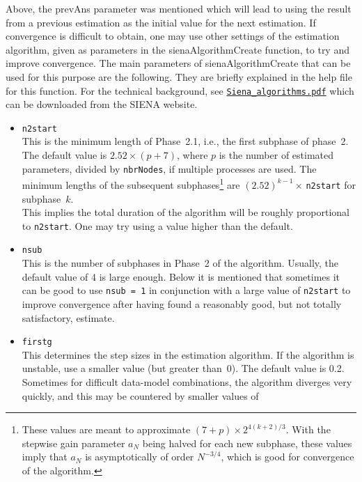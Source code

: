 \documentclass[a4paper,fleqn,11pt]{article}
\newcommand{\+}{\, + \,}
\newcommand{\sfn}[1]{\textsf{#1}}
\newcommand{\SI}{{\sf SIENA }}
\begin{document}
Above, the \sfn{prevAns} parameter was mentioned which will
lead to using the result from a previous estimation as the initial
value for the next estimation.
If convergence is difficult to obtain, one may use other
settings of the estimation algorithm, given as
parameters in the \sfn{sienaAlgorithmCreate} function, to try and
improve convergence.
The main parameters of \sfn{sienaAlgorithmCreate} that can be used
for this purpose are the following.
They are briefly explained in the help file for this function.
For the technical background, see
\href{http://www.stats.ox.ac.uk/~snijders/siena/Siena_algorithms.pdf}{\texttt{Siena\_algorithms.pdf}}
which can be downloaded from the \SI website.

\begin{itemize}
\item \texttt{n2start}\\
    This is the minimum length of Phase~2.1, i.e., the first subphase of phase~2.
    The default value
     is $2.52\times (p+7)$, where $p$ is the number of estimated parameters,
     divided by \texttt{nbrNodes}, if multiple processes are used.
    The minimum lengths of the subsequent subphases\footnote{These values are
     meant to approximate $(7+p)\times 2^{4(k+2)/3}$.
    With the stepwise gain parameter $a_N$ being halved
    for each new subphase, these values
    imply that $a_N$ is asymptotically of order $N^{-3/4}$, which is
    good for convergence of the algorithm.}
    are $(2.52)^{k-1} \times\,$\texttt{n2start} for subphase~$k$.\\
    This implies the total duration of the algorithm will be roughly proportional to
    \texttt{n2start}. One may try using a value higher than the default.
\item \texttt{nsub}\\
    This is the number of subphases in Phase~2 of the algorithm.
    Usually, the default value of 4 is large enough. Below it is mentioned
    that sometimes it can be good to use \texttt{nsub~=~1} in conjunction
    with a large value of \texttt{n2start} to improve convergence
    after having found a reasonably good, but not totally satisfactory,
    estimate.
\item \texttt{firstg}\\
    This determines the step sizes in the estimation algorithm. If the algorithm is unstable,
    use a smaller value (but greater than~0).
    The default value is 0.2.
    Sometimes for difficult data-model combinations, the algorithm
    diverges very quickly, and this may be countered by smaller values of

\end{itemize}
\end{document}
